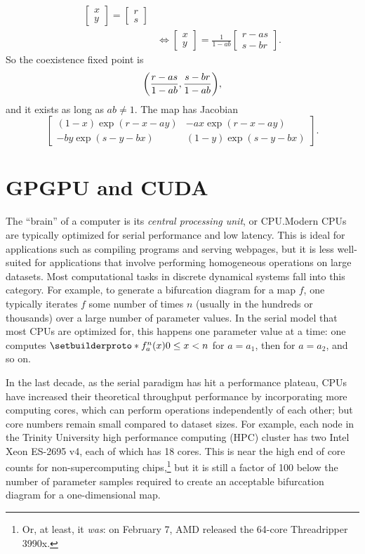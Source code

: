 \documentclass{article}
\theoremstyle{plain}
\theoremstyle{definition}
\DeclarePairedDelimiter{\parensproto}{\lparen}{\rparen}
\newcommand{\parens}{\parensproto*}
\newcommand{\setbuilder}{\setbuilderproto*}
\begin{document}
\begin{example}
\[\begin{aligned}
\begin{bmatrix}
        x
        \\
        y
      \end{bmatrix}
      =
      \begin{bmatrix}
        r
        \\
        s
      \end{bmatrix}
      \\
      &\iff
      \begin{bmatrix}
        x
        \\
        y
      \end{bmatrix}
      =
      \frac{1}{1 - ab}
      \begin{bmatrix}
        r - as
        \\
        s - br
      \end{bmatrix}.
    \end{aligned}
  \]
  So the coexistence fixed point is
  \[
    \parens{\frac{r - as}{1 - ab}, \frac{s - br}{1 - ab}},
  \]
  and it exists as long as \(ab \ne 1\). The map has Jacobian
  \[
    \begin{bmatrix}
      (1 - x)\exp(r - x - ay) & -ax\exp(r - x - ay)
      \\
      -by\exp(s - y - bx) & (1 - y)\exp(s - y - bx)
    \end{bmatrix}.
  \]
\end{example}

\section{GPGPU and CUDA}

The ``brain'' of a computer is its \emph{central processing unit}, or CPU.\@ Modern CPUs are typically optimized for serial performance and low latency. This is ideal for applications such as compiling programs and serving webpages, but it is less well-suited for applications that involve performing homogeneous operations on large datasets. Most computational tasks in discrete dynamical systems fall into this category. For example, to generate a bifurcation diagram for a map \(f\), one typically iterates \(f\) some number of times \(n\) (usually in the hundreds or thousands) over a large number of parameter values. In the serial model that most CPUs are optimized for, this happens one parameter value at a time: one computes \(\setbuilder{f_a^n(x)}{0 \le x < n}\) for \(a = a_1\), then for \(a = a_2\), and so on.

In the last decade, as the serial paradigm has hit a performance plateau, CPUs have increased their theoretical throughput performance by incorporating more computing cores, which can perform operations independently of each other; but core numbers remain small compared to dataset sizes. For example, each node in the Trinity University high performance computing (HPC) cluster has two Intel Xeon ES-2695 v4, each of which has 18 cores. This is near the high end of core counts for non-supercomputing chips,\footnote{Or, at least, it \emph{was}: on February 7, AMD released the 64-core Threadripper 3990x.} but it is still a factor of 100 below the number of parameter samples required to create an acceptable bifurcation diagram for a one-dimensional map.
\end{document}
